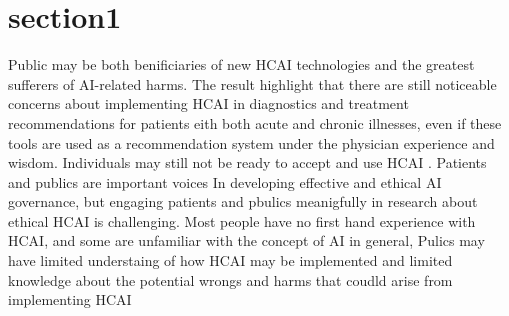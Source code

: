 \documentclass[paper=a4, fontsize=11pt]{scrartcl} %
\numberwithin{equation}{section} %
\numberwithin{figure}{section} %
\numberwithin{table}{section} %
\begin{document}
\section{section1}
Public may be both benificiaries of new HCAI technologies and the greatest sufferers of AI-related harms. The result highlight that there are still noticeable concerns about 
implementing HCAI in diagnostics and treatment recommendations for patients eith both acute and chronic illnesses, even if these tools are used as a recommendation system under the 
physician experience and wisdom. Individuals may still not be ready to accept and use HCAI \cite{esmaeilzadehPatientsPerceptionsHuman2021}. Patients and publics are important voices In
developing effective and ethical AI governance, but engaging patients and pbulics meanigfully in research about ethical HCAI is challenging. Most people have no first hand experience with HCAI,
and some are unfamiliar with the concept of AI in general, Pulics may have limited understaing of how HCAI may be implemented and limited knowledge about the potential wrongs and harms that coudld
arise from implementing HCAI \cite{frostPublicViewsEthical2022}
\end{document}
